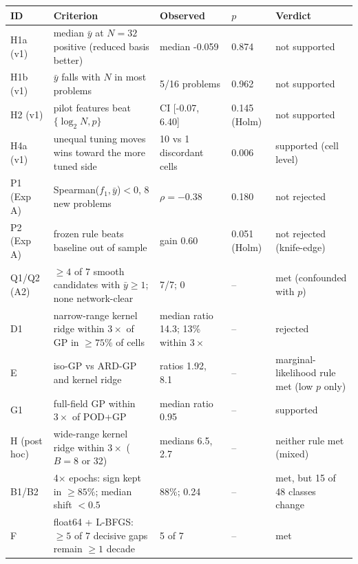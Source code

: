 \begin{tabular}{p{1.5cm}p{4.6cm}p{3.3cm}p{1.7cm}p{3.0cm}}
\toprule
ID & Criterion & Observed & $p$ & Verdict \\
\midrule
H1a (v1) & median $\bar y$ at $N{=}32$ positive (reduced basis better) & median -0.059 & 0.874 & not supported \\
H1b (v1) & $\bar y$ falls with $N$ in most problems & 5/16 problems & 0.962 & not supported \\
H2 (v1) & pilot features beat $\{\log_2N,p\}$ & CI [-0.07, 6.40] & 0.145 (Holm) & not supported \\
H4a (v1) & unequal tuning moves wins toward the more tuned side & 10 vs 1 discordant cells & 0.006 & supported (cell level) \\
P1 (Exp A) & Spearman($f_1,\bar y$)$<0$, 8 new problems & $\rho=-0.38$ & 0.180 & not rejected \\
P2 (Exp A) & frozen rule beats baseline out of sample & gain 0.60 & 0.051 (Holm) & not rejected (knife-edge) \\
Q1/Q2 (A2) & $\ge4$ of 7 smooth candidates with $\bar y\ge1$; none network-clear & 7/7; 0 & -- & met (confounded with $p$) \\
D1 & narrow-range kernel ridge within $3\times$ of GP in $\ge75\%$ of cells & median ratio 14.3; 13\% within $3\times$ & -- & rejected \\
E & iso-GP vs ARD-GP and kernel ridge & ratios 1.92, 8.1 & -- & marginal-likelihood rule met (low $p$ only) \\
G1 & full-field GP within $3\times$ of POD+GP & median ratio 0.95 & -- & supported \\
H (post hoc) & wide-range kernel ridge within $3\times$ ($B{=}8$ or 32) & medians 6.5, 2.7 & -- & neither rule met (mixed) \\
B1/B2 & 4$\times$ epochs: sign kept in $\ge85\%$; median shift $<0.5$ & 88\%; 0.24 & -- & met, but 15 of 48 classes change \\
F & float64 + L-BFGS: $\ge5$ of 7 decisive gaps remain $\ge1$ decade & 5 of 7 & -- & met \\
\bottomrule
\end{tabular}
